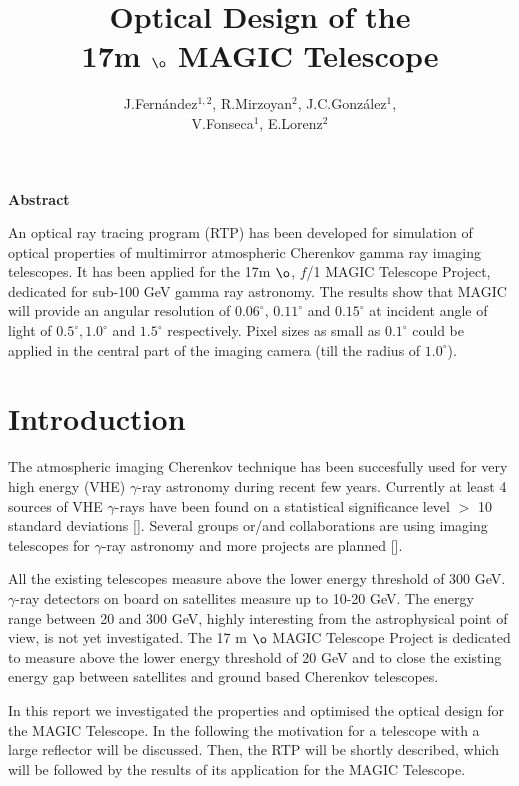 
\title{Optical Design of the \\
17m $\o$ MAGIC Telescope}
\author{J.Fern\'{a}ndez$^{1,2}$, R.Mirzoyan$^{2}$, J.C.Gonz\'{a}lez$^{1}$, \\ V.Fonseca$^{1}$, E.Lorenz$^{2}$}
\date{}
\maketitle


\centerline{{\bf Abstract}}

{\footnotesize 
An optical ray tracing program (RTP) has been developed for simulation of optical properties of multimirror atmospheric Cherenkov gamma ray imaging telescopes. It has been applied for the 17m $\o$, $f$/1 MAGIC Telescope Project, dedicated for sub-100 GeV gamma ray astronomy. The results show that MAGIC will provide an angular resolution of $0.06^{\circ}$, $0.11^{\circ}$ and $0.15^{\circ}$ at incident angle of light of $0.5^{\circ},1.0^{\circ}$ and $1.5^{\circ}$ respectively. Pixel sizes as small as $0.1^{\circ}$ could be applied in the central part of the imaging camera (till the radius of $1.0^{\circ}$).
}
\section{Introduction}

{\footnotesize 
The atmospheric imaging Cherenkov technique has been succesfully used for very high energy (VHE) $\gamma$-ray astronomy during recent few years. Currently at least 4 sources of VHE $\gamma$-rays have been found on a statistical significance level $ > $ 10 standard deviations []. Several groups or/and collaborations are using imaging telescopes for $ \gamma $-ray astronomy and more projects are planned [].

All the existing telescopes measure above the lower energy threshold of 300 GeV. $\gamma$-ray detectors on board on satellites measure up to 10-20 GeV. The energy range between 20 and 300 GeV, highly interesting from the astrophysical point of view, is not yet investigated. The 17 m $\o$ MAGIC Telescope Project is dedicated to measure above the lower energy threshold of 20 GeV and to close the existing energy gap between satellites and ground based Cherenkov telescopes.

In this report we investigated the properties and optimised the optical design for the MAGIC Telescope. In the following the motivation for a telescope with a large reflector will be discussed. Then, the RTP will be shortly described, which will be followed by the results of its application for the MAGIC Telescope.

}

